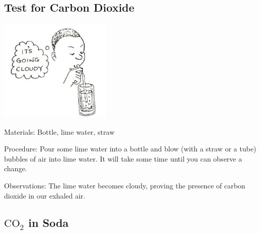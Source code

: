 \begin{multicols}{2}
\subsection{Test for Carbon Dioxide}

\begin{center}
\includegraphics[width=0.4\textwidth]{./img/source/limewater-cloudy.jpg}
\end{center}

\begin{description*}
\item[Materials:]{Bottle, lime water, straw}
\item[Procedure:]{Pour some lime water into a bottle and blow (with
a straw or a tube) bubbles of air into lime water. It will take
some time until you can observe a change.}
\item[Observations:]{The lime water becomes cloudy, proving the presence of carbon dioxide in our exhaled air.}
\end{description*}

\subsection{$\mathrm{CO_2}$ in Soda} %



\end{multicols}
